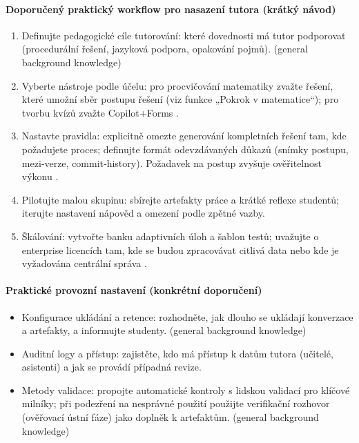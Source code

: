 \documentclass{report}%
\begin{document}
\paragraph{Doporučený praktický workflow pro nasazení tutora (krátký návod)}
\begin{enumerate}
  \item Definujte pedagogické cíle tutorování: které dovednosti má tutor podporovat (procedurální řešení, jazyková podpora, opakování pojmů). (general background knowledge)
  \item Vyberte nástroje podle účelu: pro procvičování matematiky zvažte řešení, které umožní sběr postupu řešení (viz funkce „Pokrok v matematice“); pro tvorbu kvízů zvažte Copilot+Forms \cite{kb_ai_101_tipu_pdf_04e4a115_page_8_1, kb_ai_101_tipu_pdf_04e4a115_page_36_1}.
  \item Nastavte pravidla: explicitně omezte generování kompletních řešení tam, kde požadujete proces; definujte formát odevzdávaných důkazů (snímky postupu, mezi‑verze, commit‑history). Požadavek na postup zvyšuje ověřitelnost výkonu \cite{kb_ai_101_tipu_pdf_04e4a115_page_8_1}.
  \item Pilotujte malou skupinu: sbírejte artefakty práce a krátké reflexe studentů; iterujte nastavení nápověd a omezení podle zpětné vazby.
  \item Škálování: vytvořte banku adaptivních úloh a šablon testů; uvažujte o enterprise licencích tam, kde se budou zpracovávat citlivá data nebo kde je vyžadována centrální správa \cite{kb_ai_101_tipu_pdf_04e4a115_page_36_1}.
\end{enumerate}

\paragraph{Praktické provozní nastavení (konkrétní doporučení)}
\begin{itemize}
  \item Konfigurace ukládání a retence: rozhodněte, jak dlouho se ukládají konverzace a artefakty, a informujte studenty. (general background knowledge)
  \item Auditní logy a přístup: zajistěte, kdo má přístup k datům tutora (učitelé, asistenti) a jak se provádí případná revize.
  \item Metody validace: propojte automatické kontroly s lidskou validací pro klíčové milníky; při podezření na nesprávné použití použijte verifikační rozhovor (ověřovací ústní fáze) jako doplněk k artefaktům. (general background knowledge)
\end{itemize}
\end{document}

